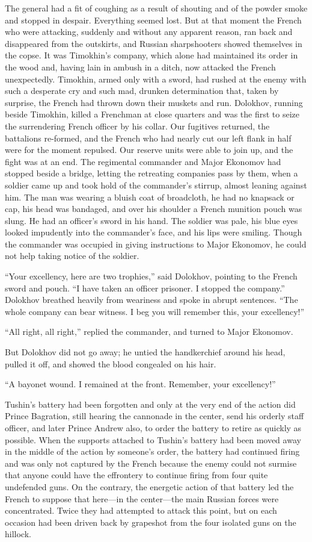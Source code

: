 The general had a fit of coughing as a result of shouting and of
the powder smoke and stopped in despair. Everything seemed
lost. But at that moment the French who were attacking, suddenly
and without any apparent reason, ran back and disappeared from
the outskirts, and Russian sharpshooters showed themselves in the
copse. It was Timokhin's company, which alone had maintained its
order in the wood and, having lain in ambush in a ditch, now
attacked the French unexpectedly. Timokhin, armed only with a
sword, had rushed at the enemy with such a desperate cry and such
mad, drunken determination that, taken by surprise, the French
had thrown down their muskets and run. Dolokhov, running beside
Timokhin, killed a Frenchman at close quarters and was the first
to seize the surrendering French officer by his collar. Our
fugitives returned, the battalions re-formed, and the French who
had nearly cut our left flank in half were for the moment
repulsed. Our reserve units were able to join up, and the fight
was at an end. The regimental commander and Major Ekonomov had
stopped beside a bridge, letting the retreating companies pass by
them, when a soldier came up and took hold of the commander's
stirrup, almost leaning against him. The man was wearing a bluish
coat of broadcloth, he had no knapsack or cap, his head was
bandaged, and over his shoulder a French munition pouch was
slung. He had an officer's sword in his hand. The soldier was
pale, his blue eyes looked impudently into the commander's face,
and his lips were smiling. Though the commander was occupied in
giving instructions to Major Ekonomov, he could not help taking
notice of the soldier.

``Your excellency, here are two trophies,'' said Dolokhov,
pointing to the French sword and pouch. ``I have taken an officer
prisoner. I stopped the company.'' Dolokhov breathed heavily from
weariness and spoke in abrupt sentences. ``The whole company can
bear witness. I beg you will remember this, your excellency!''

``All right, all right,'' replied the commander, and turned to
Major Ekonomov.

But Dolokhov did not go away; he untied the handkerchief around
his head, pulled it off, and showed the blood congealed on his
hair.

``A bayonet wound. I remained at the front. Remember, your
excellency!''

Tushin's battery had been forgotten and only at the very end of
the action did Prince Bagration, still hearing the cannonade in
the center, send his orderly staff officer, and later Prince
Andrew also, to order the battery to retire as quickly as
possible. When the supports attached to Tushin's battery had been
moved away in the middle of the action by someone's order, the
battery had continued firing and was only not captured by the
French because the enemy could not surmise that anyone could have
the effrontery to continue firing from four quite undefended
guns. On the contrary, the energetic action of that battery led
the French to suppose that here---in the center---the main
Russian forces were concentrated. Twice they had attempted to
attack this point, but on each occasion had been driven back by
grapeshot from the four isolated guns on the hillock.

